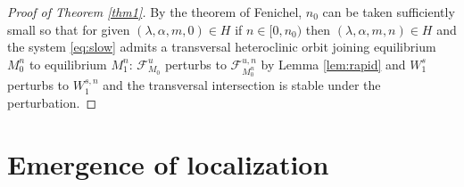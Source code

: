 \documentclass[usletter,11pt]{article}
\theoremstyle{remark}
\begin{document}
\begin{proof}[Proof of Theorem \ref{thm1}] 
 By the theorem of Fenichel, $n_0$ can be taken sufficiently small so that for given $(\lambda,\alpha,m,0)\in H$ if $n \in [0, n_0)$ then $(\lambda,\alpha,m,n) \in H$ and  the system  \eqref{eq:slow} admits a transversal heteroclinic orbit joining equilibrium $M_0^{n}$ to equilibrium $M_1^{n}$: $\mathcal{F}^u_{M_0}$ perturbs to $\mathcal{F}^{u,n}_{M_0^n}$ by Lemma \ref{lem:rapid} and $W_1^s$ perturbs to $W_1^{s,n}$ and the transversal intersection is stable under the perturbation. 
\end{proof}


\section{Emergence of localization}
\label{sec:localization}
%
\end{document}
